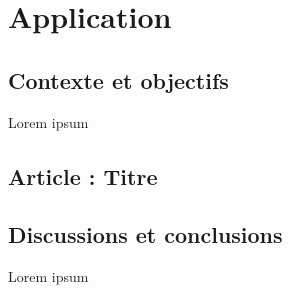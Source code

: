 \chapter{Application}\label{chap:application}

\section{Contexte et objectifs}

Lorem ipsum 

\section{Article : Titre} %



\section{Discussions et conclusions}

Lorem ipsum
